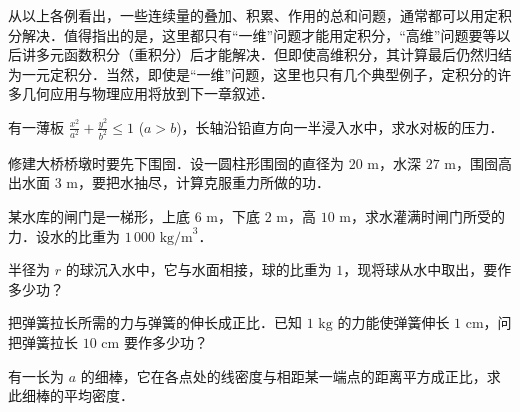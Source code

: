 从以上各例看出，一些连续量的叠加、积累、作用的总和问题，通常都可以用定积分解决．值得指出的是，这里都只有“一维”问题才能用定积分，“高维”问题要等以后讲多元函数积分（重积分）后才能解决．但即使高维积分，其计算最后仍然归结为一元定积分．当然，即使是“一维”问题，这里也只有几个典型例子，定积分的许多几何应用与物理应用将放到下一章叙述．

\begin{xiti}
\item 有一薄板 $\frac{x^2}{a^2} + \frac{y^2}{b^2} \leqslant 1$ ($a > b$)，长轴沿铅直方向一半浸入水中，求水对板的压力．

\item 修建大桥桥墩时要先下围囹．设一圆柱形围囹的直径为 $20\text{ m}$，水深 $27\text{ m}$，围囹高出水面 $3\text{ m}$，要把水抽尽，计算克服重力所做的功．

\item 某水库的闸门是一梯形，上底 $6\text{ m}$，下底 $2\text{ m}$，高 $10\text{ m}$，求水灌满时闸门所受的力．设水的比重为 $1\,000\text{ kg/m}^3$．

\item 半径为 $r$ 的球沉入水中，它与水面相接，球的比重为 $1$，现将球从水中取出，要作多少功？

\item 把弹簧拉长所需的力与弹簧的伸长成正比．已知 $1\text{ kg}$ 的力能使弹簧伸长 $1\text{ cm}$，问把弹簧拉长 $10\text{ cm}$ 要作多少功？

\item 有一长为 $a$ 的细棒，它在各点处的线密度与相距某一端点的距离平方成正比，求此细棒的平均密度．
\end{xiti}
